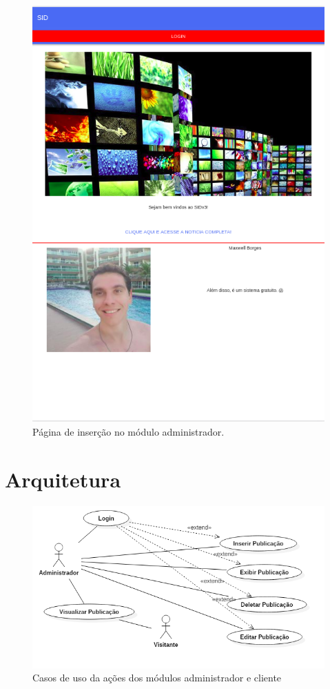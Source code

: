 \begin{figure}[H]
\centering
\includegraphics[scale=0.6]{figuras/mobile1}
\caption{Página de inserção no módulo administrador.}
\label{fig:mobile1}
\end{figure}


\section{Arquitetura}
\begin{figure}[H]
\centering
\includegraphics[scale=0.6]{figuras/casosDeUso}
\caption{Casos de uso da ações dos módulos administrador e cliente}
\label{fig:casosDeUso}
\end{figure}


